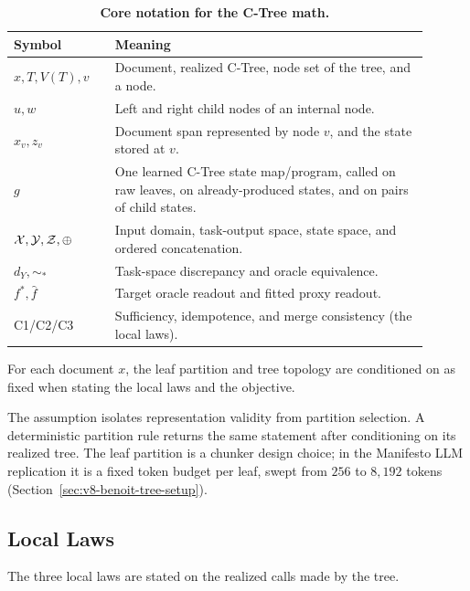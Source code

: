\begin{table}[t]
  \centering
  \small
  \begin{tabular}{@{}p{0.22\linewidth}p{0.68\linewidth}@{}}
    \toprule
    Symbol & Meaning \\
    \midrule
    \(x,T,V(T),v\) & Document, realized C-Tree, node set of the tree, and a node. \\
    \(u,w\) & Left and right child nodes of an internal node. \\
    \(x_v,z_v\) & Document span represented by node \(v\), and the state stored at \(v\). \\
    \(g\) & One learned C-Tree state map/program, called on raw leaves, on already-produced states, and on pairs of child states. \\
    \(\mathcal X,\mathcal Y,\mathcal Z,\oplus\) & Input domain, task-output space, state space, and ordered concatenation. \\
    \(d_Y,\sim_\ast\) & Task-space discrepancy and oracle equivalence. \\
    \(f^\ast,\widehat f\) & Target oracle readout and fitted proxy readout. \\
    C1/C2/C3 & Sufficiency, idempotence, and merge consistency (the local laws). \\
    \bottomrule
  \end{tabular}
  \caption{\textbf{Core notation for the C-Tree math.}}
  \label{tab:v8-core-notation}
\end{table}

\begin{assumption}\label{ass:v8-fixed-tree}
For each document \(x\), the leaf partition and tree topology are conditioned
on as fixed when stating the local laws and the objective.
\end{assumption}

The assumption isolates representation validity from partition
selection. A deterministic partition rule returns the same statement
after conditioning on its realized tree. The leaf partition is a
chunker design choice; in the Manifesto LLM replication it is a
fixed token budget per leaf, swept from \(256\) to \(8{,}192\) tokens
(Section~\ref{sec:v8-benoit-tree-setup}).

\subsection{Local Laws}

The three local laws are stated on the realized calls made by the tree.

